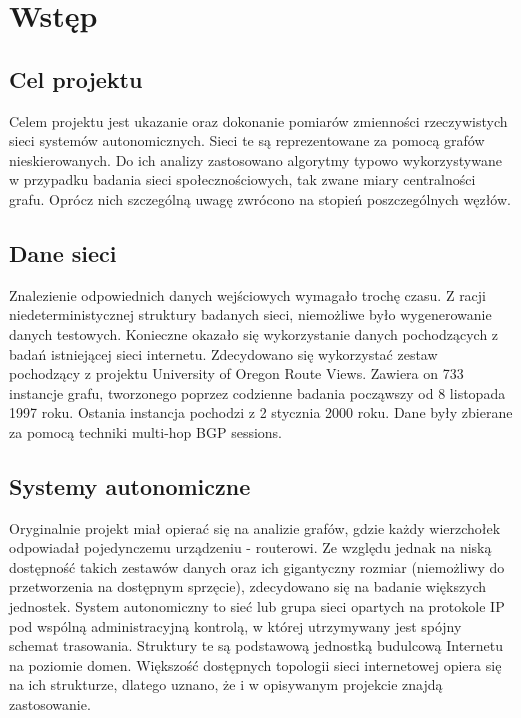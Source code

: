 \chapter{Wstęp}
\section{Cel projektu}

Celem projektu jest ukazanie oraz dokonanie pomiarów zmienności rzeczywistych sieci systemów autonomicznych. Sieci te są reprezentowane za pomocą grafów nieskierowanych. Do ich analizy zastosowano algorytmy typowo wykorzystywane w przypadku badania sieci społecznościowych, tak zwane miary centralności grafu. Oprócz nich szczególną uwagę zwrócono na stopień poszczególnych węzłów.

\section{Dane sieci}

Znalezienie odpowiednich danych wejściowych wymagało trochę czasu. Z racji niedeterministycznej struktury badanych sieci, niemożliwe było wygenerowanie danych testowych. Konieczne okazało się wykorzystanie danych pochodzących z badań istniejącej sieci internetu. Zdecydowano się wykorzystać zestaw pochodzący z projektu University of Oregon Route Views. Zawiera on 733 instancje grafu, tworzonego poprzez codzienne badania począwszy od 8 listopada 1997 roku. Ostania instancja pochodzi z 2 stycznia 2000 roku. Dane były zbierane za pomocą techniki multi-hop BGP sessions.  

\section{Systemy autonomiczne}
Oryginalnie projekt miał opierać się na analizie grafów, gdzie każdy wierzchołek odpowiadał pojedynczemu urządzeniu - routerowi. Ze względu jednak na niską dostępność takich zestawów danych oraz ich gigantyczny rozmiar (niemożliwy do przetworzenia na dostępnym sprzęcie), zdecydowano się na badanie większych jednostek. System autonomiczny to sieć lub grupa sieci opartych na protokole IP pod wspólną administracyjną kontrolą, w której utrzymywany jest spójny schemat trasowania. Struktury te są podstawową jednostką budulcową Internetu na poziomie domen. Większość dostępnych topologii sieci internetowej opiera się na ich strukturze, dlatego uznano, że i w opisywanym projekcie znajdą zastosowanie.


